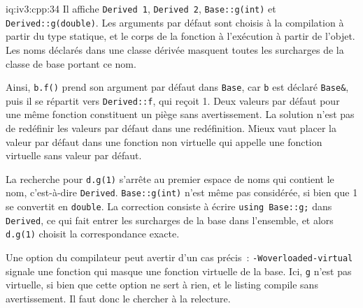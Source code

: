 \begin{solution}{iq:iv3:cpp:34}
Il affiche \texttt{Derived 1}, \texttt{Derived 2}, \texttt{Base::g(int)} et \texttt{Derived::g(double)}. Les arguments par défaut sont choisis à la compilation à partir du type statique, et le corps de la fonction à l'exécution à partir de l'objet. Les noms déclarés dans une classe dérivée masquent toutes les surcharges de la classe de base portant ce nom.

Ainsi, \texttt{b.f()} prend son argument par défaut dans \texttt{Base}, car \texttt{b} est déclaré \texttt{Base\&}, puis il se répartit vers \texttt{Derived::f}, qui reçoit 1. Deux valeurs par défaut pour une même fonction constituent un piège sans avertissement. La solution n'est pas de redéfinir les valeurs par défaut dans une redéfinition. Mieux vaut placer la valeur par défaut dans une fonction non virtuelle qui appelle une fonction virtuelle sans valeur par défaut.

La recherche pour \texttt{d.g(1)} s'arrête au premier espace de noms qui contient le nom, c'est-à-dire \texttt{Derived}. \texttt{Base::g(int)} n'est même pas considérée, si bien que 1 se convertit en \texttt{double}. La correction consiste à écrire \texttt{using Base::g;} dans \texttt{Derived}, ce qui fait entrer les surcharges de la base dans l'ensemble, et alors \texttt{d.g(1)} choisit la correspondance exacte.

Une option du compilateur peut avertir d'un cas précis~: \texttt{-Woverloaded-virtual} signale une fonction qui masque une fonction virtuelle de la base. Ici, \texttt{g} n'est pas virtuelle, si bien que cette option ne sert à rien, et le listing compile sans avertissement. Il faut donc le chercher à la relecture.

\end{solution}

